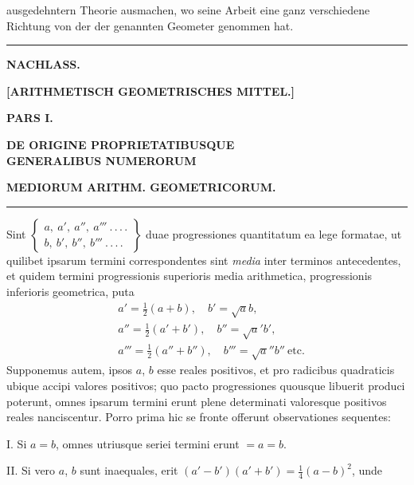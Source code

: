 ausgedehntern Theorie ausmachen, wo seine Arbeit eine ganz verschiedene Richtung von der der genannten Geometer genommen hat.
\begin{center}\rule{0.25\linewidth}{0.4pt}\end{center}
\clearpage{}
\begin{center}
\textbf{NACHLASS.}\par
\textbf{[ARITHMETISCH GEOMETRISCHES MITTEL.]}\par
\textbf{PARS I.}\par
\textbf{DE ORIGINE PROPRIETATIBUSQUE}\\\textbf{GENERALIBUS NUMERORUM}\par
\textbf{MEDIORUM ARITHM. GEOMETRICORUM.}\par
\rule{0.09\linewidth}{0.4pt}\par
\end{center}
Sint $\left\{\begin{array}{l}a,\allowbreak \ a',\allowbreak \ a'',\allowbreak \ a'''\ .\,\allowbreak .\,\allowbreak .\,\allowbreak .\\ b,\allowbreak \ b',\allowbreak \ b'',\allowbreak \ b'''\ .\,\allowbreak .\,\allowbreak .\,\allowbreak .\end{array}\right\}$ duae progressiones quantitatum ea lege formatae, ut
quilibet ipsarum termini correspondentes sint \textit{media} inter terminos antecedentes,
et quidem termini progressionis superioris media arithmetica, progressionis inferioris geometrica, puta
\[
\begin{aligned}&a'=\tfrac12(a+b),\quad b'=\surd ab,\\[6pt]&a''=\tfrac12(a'+b'),\quad b''=\surd a'b',\\[6pt]&a'''=\tfrac12(a''+b''),\quad b'''=\surd a''b''\ \mathrm{etc.}\end{aligned}
\]
Supponemus autem, ipsos $a$, $b$ esse reales positivos, et pro radicibus quadraticis
ubique accipi valores positivos; quo pacto progressiones quousque libuerit produci
poterunt, omnes ipsarum termini erunt plene determinati valoresque positivos reales nanciscentur. Porro prima hic se fronte offerunt observationes sequentes:
\par
I. Si $a=b$, omnes utriusque seriei termini erunt $=a=b$.
\par
II. Si vero $a$, $b$ sunt inaequales, erit $(a'-b')(a'+b')=\tfrac14(a-b)^2$, unde
